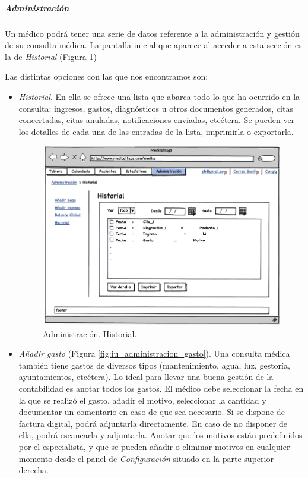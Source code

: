 		
		
		\subparagraph{Administración} %
		\label{par:medico_administracion}
		
			Un médico podrá tener una serie de datos referente a la administración y gestión de su consulta médica. La pantalla inicial que aparece al acceder a esta sección es la de \textit{Historial} (Figura \ref{fig:iu_administracion_historial})
			
			Las distintas opciones con las que nos encontramos son:
			
			\begin{itemize}
				\item \textit{Historial}. En ella se ofrece una lista que abarca todo lo que ha ocurrido en la consulta: ingresos, gastos, diagnósticos u otros documentos generados, citas concertadas, citas anuladas, notificaciones enviadas, etcétera. Se pueden ver los detalles de cada una de las entradas de la lista, imprimirla o exportarla.
				
				
					\begin{figure}[H]
				  		\centering
				    	\includegraphics[width=12cm]{img/png/interfaz/22_1_Administracion_Historial_Medico.png}
				  		\caption{Administración. Historial.}
				  		\label{fig:iu_administracion_historial}
					\end{figure}
				
				\item \textit{Añadir gasto} (Figura \ref{fig:iu_administracion_gasto}). Una consulta médica también tiene gastos de diversos tipos (mantenimiento, agua, luz, gestoría, ayuntamientos, etcétera). Lo ideal para llevar una buena gestión de la contabilidad es anotar todos los gastos. El médico debe seleccionar la fecha en la que se realizó el gasto, añadir el motivo, seleccionar la cantidad y documentar un comentario en caso de que sea necesario. Si se dispone de factura digital, podrá adjuntarla directamente. En caso de no disponer de ella, podrá escanearla y adjuntarla. Anotar que los motivos están predefinidos por el especialista, y que se pueden añadir o eliminar motivos en cualquier momento desde el panel de \textit{Configuración} situado en la parte superior derecha.
				

\end{itemize}

